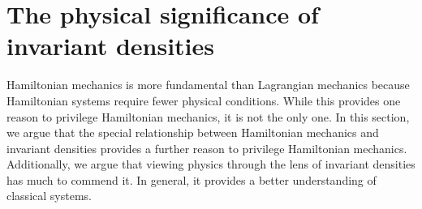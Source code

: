 \documentclass[letterpaper]{article}
\begin{document}
\section{The physical significance of invariant densities}
\label{density}

Hamiltonian mechanics is more fundamental than Lagrangian mechanics because Hamiltonian systems require fewer physical conditions. While this provides one reason to privilege Hamiltonian mechanics, it is not the only one. In this section, we argue that the special relationship between Hamiltonian mechanics and invariant densities provides a further reason to privilege Hamiltonian mechanics. Additionally, we argue that viewing physics through the lens of invariant densities has much to commend it. In general, it provides a better understanding of classical systems. 
\end{document}

